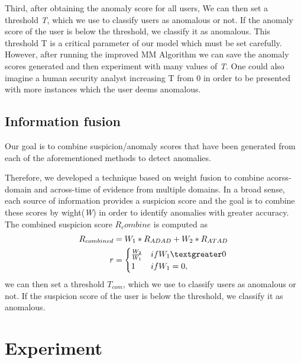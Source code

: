 \documentclass[conference]{IEEEtran}
\begin{document}
Third, after obtaining the anomaly score for all users, 
We can then set a threshold \emph{T}, which we use to classify users as anomalous or not. If the anomaly score of the user is below the threshold, we classify it as anomalous. This threshold T is a critical parameter of our model which must be set carefully.
However, after running the improved MM Algorithm we can save the anomaly scores generated and then experiment with many values of \emph{T}. One could also imagine a human security analyst increasing T from 0 in order to be presented with more instances which the user deems anomalous.

\fi
\subsection{Information fusion}
Our goal is to combine suspicion/anomaly scores that have been generated from each of the aforementioned methods to detect anomalies.

Therefore, we developed a technique based on weight fusion to combine acorss-domain and across-time of evidence from multiple domains. In a broad sense, each source of information provides a suspicion score and the goal is to combine these scores by wight(\emph{W}) in order to identify anomalies with greater accuracy. The combined suspicion score \emph{$R_combine$} is computed as
\begin{align}
R_{combined}&= W_1*R_{ADAD}+W_2*R_{ATAD}\\
r&=\begin{cases}
\frac{W_2}{W_1}
&\mbox{if } W_1 \textgreater 0\\
1
&\mbox{if } W_1 = 0,\\
\end{cases}
\end{align}
we can then set a threshold \emph{$T_{com}$}, which we use to classify users as anomalous or not. If the suspicion score of the user is below the threshold, we classify it as anomalous.

\section{Experiment}
\end{document}
